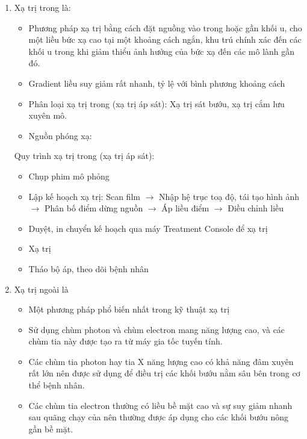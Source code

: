     \begin{enumerate}
        \item %
        Xạ trị trong là:
            \begin{itemize}
                \item Phương pháp xạ trị bằng cách đặt nguồng vào trong hoặc gần khối u, cho một liều bức xạ cao tại một khoảng cách ngắn, khu trú chính xác đến các khối u trong khi giảm thiểu ảnh hưởng của bức xạ đến các mô lành gần đó.
                \item Gradient liều suy giảm rất nhanh, tỷ lệ với bình phương khoảng cách
                \item Phân loại xạ trị trong (xạ trị áp sát): Xạ trị sát bướu, xạ trị cắm lưu xuyên mô.
                \item Nguồn phóng xạ: 
            \end{itemize}
        Quy trình xạ trị trong (xạ trị áp sát):
            \begin{itemize}
                \item Chụp phim mô phỏng
                \item Lập kế hoạch xạ trị: Scan film $\rightarrow$ Nhập hệ trục toạ độ, tái tạo hình ảnh $\rightarrow$ Phân bố điểm dừng nguồn $\rightarrow$ Áp liều điểm $\rightarrow$ Điều chỉnh liều
                \item Duyệt, in chuyển kế hoạch qua máy Treatment Console để xạ trị
                \item Xạ trị
                \item Tháo bộ áp, theo dõi bệnh nhân
            \end{itemize}
        \item %
        Xạ trị ngoài là
            \begin{itemize}
                \item Một phương pháp phổ biến nhất trong kỹ thuật xạ trị
                \item Sử dụng chùm photon và chùm electron mang năng lượng cao, và các chùm tia này được tạo ra từ máy gia tốc tuyến tính. 
                \item Các chùm tia photon hay tia X năng lượng cao có khả năng đâm xuyên rất lớn nên được sử dụng để điều trị các khối bướu nằm sâu bên trong cơ thể bệnh nhân. 
                \item Các chùm tia electron thường có liều bề mặt cao và sự suy giảm nhanh sau quãng chạy của nên thường được áp dụng cho các khối bướu nông gần bề mặt.

\end{itemize}
\end{enumerate}
